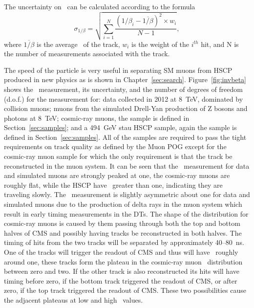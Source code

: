 The uncertainty on \invbeta\ can be calculated according to the formula
\begin{equation}
 \sigma_{1/\beta} = \sqrt{\sum_{i=1}^N \frac{(1/\beta_i - \overline{1/\beta})^2 \times w_{i}}{N-1}},
 \label{betaerr}
\end{equation}
where $\overline{1/\beta}$ is the average \invbeta\ of the track, $w_{i}$ is the weight of the $i^{th}$ hit, and N is the number of measurements associated with the track.

The speed of the particle is very useful in separating SM muons from HSCP produced in new physics as is shown in Chapter~\ref{sec:search}.
Figure~\ref{fig:invbeta} shows the \invbeta\ measurement, its uncertainty, and the number of degrees of freedom (d.o.f.) for the measurement for:
data collected in 2012 at 8~TeV, dominated by collision muons; 
muons from the simulated Drell-Yan production of Z bosons and photons at 8~TeV; cosmic-ray muons, the sample is defined in Section~\ref{sec:samples};
and a 494~GeV stau HSCP sample, again the sample is defined in Section~\ref{sec:samples}. All of the samples are required to pass the tight requirements on track quality
as defined by the Muon POG except for the cosmic-ray muon sample for which the only requirement is that the track be reconstructed in the muon system.
It can be seen that the \invbeta\ measurement for data and simulated muons are strongly peaked at one, the cosmic-ray muons are roughly flat, while
the HSCP have \invbeta\ greater than one, indicating they are traveling slowly. The \invbeta\ measurement is slightly asymmetric about one for data and simulated muons
due to the production of delta rays in the muon system which result in early timing measurements in the DTs. The shape of the distribution for cosmic-ray muons
is caused by them passing through both the top and bottom halves of CMS and possibly having tracks be reconstructed in both halves.
The timing of hits from the two tracks will be separated by approximately 40--80~ns.
One of the tracks will trigger the readout of CMS and thus will have \invbeta\ roughly around one, these tracks form the plateau in the cosmic-ray muon \invbeta\
distribution between zero and two. If the other track is also reconstructed its hits will have timing before zero, if the bottom track triggered the readout of CMS, or
after zero, if the top track triggered the readout of CMS. These two possibilities cause the adjacent plateaus at low and high \invbeta\ values.

